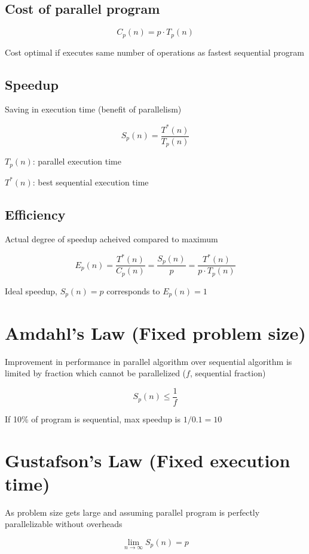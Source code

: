 \documentclass[12pt]{article}
\begin{document}
\begin{spacing}{1.5}
\subsection{Cost of parallel program}

$$C_p (n) = p \cdot T_p (n)$$

Cost optimal if executes same number of operations as fastest sequential program

\subsection{\color{red} Speedup}

Saving in execution time (benefit of parallelism)

$$S_p(n) = \frac{T^*(n)}{T_p(n)}$$

\begin{itemize*}
	\item $T_p(n)$: parallel execution time
	\item $T^*(n)$: best sequential execution time
\end{itemize*}

\subsection{Efficiency}

Actual degree of speedup acheived compared to maximum

$$E_p(n) = \frac{T^*(n)}{C_p(n)} = \frac{S_p(n)}{p} = \frac{T^*(n)}{p \cdot T_p(n)}$$

Ideal speedup, $S_p(n) = p$ corresponds to $E_p(n) = 1$

\section{Amdahl's Law (Fixed problem size)}

Improvement in performance in parallel algorithm over sequential algorithm is limited by fraction which cannot be parallelized ($f$, sequential fraction)

$$S_p(n) \le \frac{1}{f}$$

If 10\% of program is sequential, max speedup is $1/0.1=10$

\section{Gustafson's Law (Fixed execution time)}

As problem size gets large and assuming parallel program is perfectly parallelizable without overheads

$$\lim_{n \to \infty} S_p(n) = p$$

\end{spacing}
\end{document}
